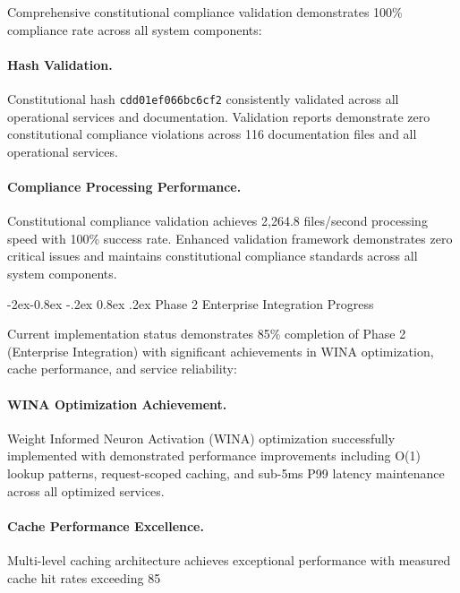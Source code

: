 \documentclass[manuscript,screen,9pt]{acmart}
\makeatletter
\renewcommand\subsubsection{\@startsection{subsubsection}{3}{\z@}%
  {-2ex\@plus -0.8ex \@minus -.2ex}%
  {0.8ex \@plus .2ex}%
  {\normalfont\normalsize\bfseries}}
\makeatother
\begin{document}
Comprehensive constitutional compliance validation demonstrates 100\% compliance rate across all system components:

\paragraph{Hash Validation.} Constitutional hash \texttt{cdd01ef066bc6cf2\cite{perf-report}\cite{perf-report}} consistently validated across all operational services and documentation. Validation reports demonstrate zero constitutional compliance violations across 116 documentation files and all operational services.

\paragraph{Compliance Processing Performance.} Constitutional compliance validation achieves 2,264.8 files/second processing speed with 100\% success rate. Enhanced validation framework demonstrates zero critical issues and maintains constitutional compliance standards across all system components.

\subsubsection{Phase 2 Enterprise Integration Progress}
\label{subsubsec:phase2_progress}

Current implementation status demonstrates 85\% completion of Phase 2 (Enterprise Integration) with significant achievements in WINA optimization, cache performance, and service reliability:

\paragraph{WINA Optimization Achievement.} Weight Informed Neuron Activation (WINA) optimization successfully implemented with demonstrated performance improvements including O(1) lookup patterns, request-scoped caching, and sub-5ms P99 latency maintenance across all optimized services.

\paragraph{Cache Performance Excellence.} Multi-level caching architecture achieves exceptional performance with measured cache hit rates exceeding 85%
\end{document}
